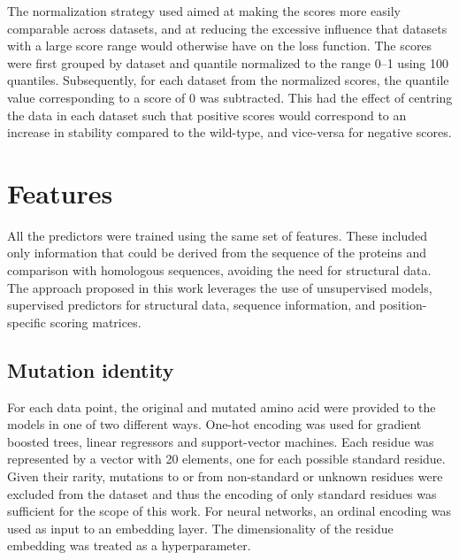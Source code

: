 The normalization strategy used aimed at making the scores more easily comparable across datasets, and at reducing the excessive influence that datasets with a large score range would otherwise have on the loss function.
The scores were first grouped by dataset and quantile normalized to the range \numrange{0}{1} using \num{100} quantiles.
Subsequently, for each dataset from the normalized scores, the quantile value corresponding to a score of \num{0} was subtracted.
This had the effect of centring the data in each dataset such that positive scores would correspond to an increase in stability compared to the wild-type, and vice-versa for negative scores.

\FloatBarrier%
\section{Features}
All the predictors were trained using the same set of features.
These included only information that could be derived from the sequence of the proteins and comparison with homologous sequences, avoiding the need for structural data.
The approach proposed in this work leverages the use of unsupervised models, supervised predictors for structural data, sequence information, and position-specific scoring matrices.

\subsection{Mutation identity}
For each data point, the original and mutated amino acid were provided to the models in one of two different ways.
One-hot encoding was used for gradient boosted trees, linear regressors and support-vector machines.
Each residue was represented by a vector with 20 elements, one for each possible standard residue.
Given their rarity, mutations to or from non-standard or unknown residues were excluded from the dataset and thus the encoding of only standard residues was sufficient for the scope of this work.
For neural networks, an ordinal encoding was used as input to an embedding layer.
The dimensionality of the residue embedding was treated as a hyperparameter.


